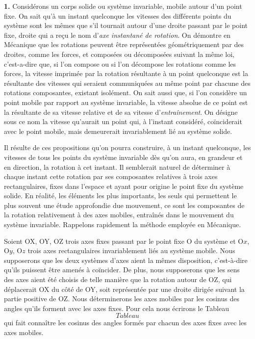 \label{chp1}

\textbf{1.} Considérons un corps solide ou système invariable, mobile autour d'un point fixe. On sait qu'à un instant 
quelconque les vitesses des différents points du système sont les mêmes que s'il tournait autour d'une droite passant 
par le point fixe, droite qui a reçu le nom d'\textit{axe instantané de rotation}. On démontre en Mécanique que les 
rotations peuvent être représentées géométriquement par des droites, comme les forces, et composées ou décomposées 
suivant la même loi, c'est-a-dire que, si l'on compose ou si l'on décompose les rotations comme les forces, la vitesse 
imprimée par la rotation résultante à un point quelconque est la résultante des vitesses qui seraient communiquées au 
même point par chacune des rotations composantes, existant isolément. On sait aussi que, si l'on considère un point 
mobile par rapport au système invariable, la vitesse absolue de ce point est la résultante de sa vitesse relative et 
de sa vitesse d'\textit{entraînement}. On désigne sous ce nom la vitesse qu'aurait un point qui, à l'instant considéré, 
coïnciderait avec le point mobile, mais demeurerait invariablement lié au système solide.

Il résulte de ces propositions qu'on pourra construire, à un instant quelconque, les vitesses de tous les points du 
système invariable dès qu'on aura, en grandeur et en direction, la rotation à cet instant. Il semblerait naturel de 
déterminer à chaque instant cette rotation par ses composantes relatives à trois axes rectangulaires, fixes dans 
l'espace et ayant pour origine le point fixe du système solide. En réalité, les éléments les plus importants, les seuls 
qui permettent le plus souvent une étude approfondie due mouvement, ce sont les composantes de la rotation relativement 
à des axes mobiles, entraînés dans le mouvement du système invariable. Rappelons rapidement la méthode employée en 
Mécanique.

Soient OX, OY, OZ trois axes fixes passant par le point fixe O du système et O$x$, O$y$, O$z$ trois axes rectangulaires 
invariablement liés au système mobile. Nous supposerons que les deux systèmes d'axes aient la mêmes disposition, 
c'est-à-dire qu'ils puissent être amenés à coïncider. De plus, nous supposerons que les sens des axes aient été choisis 
de telle manière que la rotation autour de OZ, qui déplacerait OX du côté de OY, soit représentée par une droite 
dirigée suivant la partie positive de OZ. Nous déterminerons les axes mobiles par les cosinus des angles qu'ils forment 
avec les axes fixes. Pour cela nous écrirons le Tableau
$$
Tableau
$$
qui fait connaître les cosinus des angles formés par chacun des axes fixes avec les axes mobiles.
 